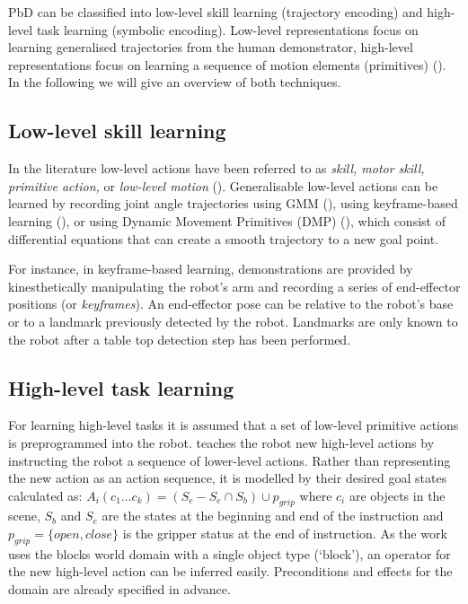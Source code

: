 
PbD can be classified into low-level skill learning (trajectory encoding) and high-level task learning (symbolic encoding).
Low-level representations focus on learning generalised trajectories from the human demonstrator, high-level representations focus on learning a sequence of motion elements (primitives) (\cite{peppoloni2014ros}). In the following we will give an overview of both techniques.


\subsection{Low-level skill learning}
In the literature low-level actions have been referred to as \textit{skill, motor skill, primitive action,} or \textit{low-level motion} (\cite{chernova2014robot}).
Generalisable low-level actions can be learned by recording joint angle trajectories using GMM (\cite{billard2008robot}), using keyframe-based learning (\cite{akgun2012keyframe}), or using Dynamic Movement Primitives (DMP) (\cite{pastor2009learning}), which consist of differential equations that can create a smooth trajectory to a new goal point.

For instance, in keyframe-based learning, demonstrations are provided by kinesthetically manipulating the robot's arm and recording a series of end-effector positions (or \textit{keyframes}). 
An end-effector pose can be relative to the robot's base or to a landmark previously detected by the robot.
Landmarks are only known to the robot after a table top detection step has been performed.


\subsection{High-level task learning}
For learning high-level tasks it is assumed that a set of low-level primitive actions is preprogrammed into the robot. 
\cite{she2014teaching} teaches the robot new high-level actions by instructing the robot a sequence of lower-level actions.
Rather than representing the new action as an action sequence, it is modelled by their desired goal states calculated as:
$A_i(c_1 \dots c_k) = (S_e - S_e \cap S_b) \cup p_{grip}$ where $c_i$ are objects in the scene, $S_b$ and $S_e$ are the states at the beginning and end of the instruction and $p_{grip} = \{open, close\}$ is the gripper status at the end of instruction.
As the work uses the blocks world domain with a single object type (`block'), an operator for the new high-level action can be inferred easily. Preconditions and effects for the domain are already specified in advance.

